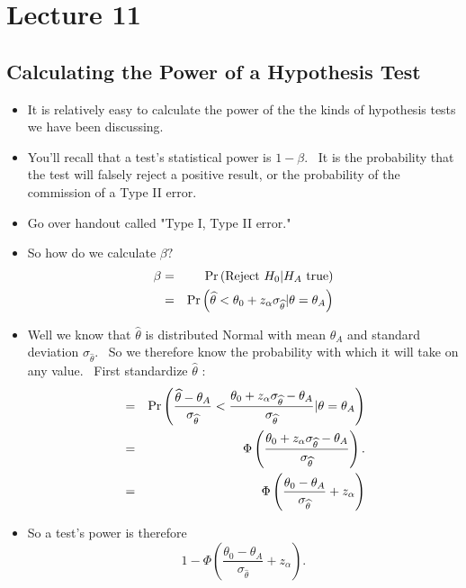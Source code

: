 \documentclass[11pt]{article}
\begin{document}
\section{Lecture 11}

\subsection{Calculating the Power of a Hypothesis Test}

\begin{itemize}
\item It is relatively easy to calculate the power of the the kinds of
hypothesis tests we have been discussing.

\item You'll recall that a test's statistical power is $1-\beta .$ \ It is
the probability that the test will falsely reject a positive result, or the
probability of the commission of a Type II error.

\item Go over handout called "Type I, Type II error."

\item So how do we calculate $\beta ?$%
\begin{eqnarray*}
\beta &=&\Pr \left( \text{Reject }H_{0}|H_{A}\text{ true}\right) \\
&=&\Pr \left( \widehat{\theta }<\theta _{0}+z_{\alpha }\sigma _{\widehat{%
\theta }}|\theta =\theta _{A}\right)
\end{eqnarray*}

\item Well we know that $\widehat{\theta }$ is distributed Normal with mean $%
\theta _{A}$ and standard deviation $\sigma _{\widehat{\theta }}.$ \ So we
therefore know the probability with which it will take on any value. \ First
standardize $\widehat{\theta }$ :%
\begin{eqnarray*}
&=&\Pr \left( \frac{\widehat{\theta }-\theta _{A}}{\sigma _{\widehat{\theta }%
}}<\frac{\theta _{0}+z_{\alpha }\sigma _{\widehat{\theta }}-\theta _{A}}{%
\sigma _{\widehat{\theta }}}|\theta =\theta _{A}\right) \\
&=&\Phi \left( \frac{\theta _{0}+z_{\alpha }\sigma _{\widehat{\theta }%
}-\theta _{A}}{\sigma _{\widehat{\theta }}}\right) . \\
&=&\Phi \left( \frac{\theta _{0}-\theta _{A}}{\sigma _{\widehat{\theta }}}%
+z_{\alpha }\right)
\end{eqnarray*}

\item So a test's power is therefore 
\begin{equation*}
1-\Phi \left( \frac{\theta _{0}-\theta _{A}}{\sigma _{\widehat{\theta }}}%
+z_{\alpha }\right) .
\end{equation*}


\end{itemize}
\end{document}
